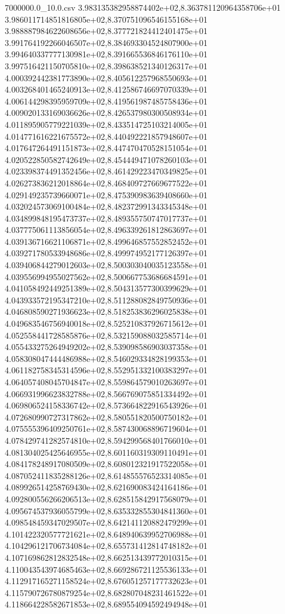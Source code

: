 \begin{filecontents*}{7000000.0_10.0.csv}
3.983135382958874402e+02,8.363781120964358706e+01
3.986011714851816805e+02,8.370751096546155168e+01
3.988887984622608656e+02,8.377721824412401475e+01
3.991764192266046507e+02,8.384693304524807900e+01
3.994640337777130981e+02,8.391665536846176110e+01
3.997516421150705810e+02,8.398638521340126317e+01
4.000392442381773890e+02,8.405612257968550693e+01
4.003268401465240913e+02,8.412586746697070339e+01
4.006144298395959709e+02,8.419561987485758436e+01
4.009020133169036626e+02,8.426537980300508934e+01
4.011895905779221039e+02,8.433514725103214005e+01
4.014771616221675572e+02,8.440492221857948607e+01
4.017647264491151873e+02,8.447470470528151054e+01
4.020522850582742649e+02,8.454449471078260103e+01
4.023398374491352456e+02,8.461429223470349825e+01
4.026273836212018864e+02,8.468409727669677522e+01
4.029149235739660071e+02,8.475390983639408660e+01
4.032024573069100484e+02,8.482372991343345348e+01
4.034899848195473737e+02,8.489355750747017737e+01
4.037775061113856054e+02,8.496339261812863697e+01
4.039136716621106871e+02,8.499646857552852452e+01
4.039271780533948686e+02,8.499974952177126397e+01
4.039406844279012603e+02,8.500303040035123558e+01
4.039556994955027562e+02,8.500667753686684591e+01
4.041058492449251389e+02,8.504313577300399629e+01
4.043933572195347210e+02,8.511288082849750936e+01
4.046808590271936623e+02,8.518253836296025838e+01
4.049683546756940018e+02,8.525210837926715612e+01
4.052558441728585876e+02,8.532159088032585714e+01
4.055433275264949202e+02,8.539098586903037358e+01
4.058308047444486988e+02,8.546029334828199353e+01
4.061182758345314596e+02,8.552951332100383297e+01
4.064057408045704847e+02,8.559864579010263697e+01
4.066931996623832788e+02,8.566769075851334492e+01
4.069806524158336742e+02,8.573664822916543926e+01
4.072680990727317862e+02,8.580551820500750182e+01
4.075555396409250761e+02,8.587430068896719604e+01
4.078429741282574810e+02,8.594299568401766010e+01
4.081304025425646955e+02,8.601160319309110491e+01
4.084178248917080509e+02,8.608012321917522058e+01
4.087052411835288126e+02,8.614855576523314085e+01
4.089926514258769430e+02,8.621690083424164186e+01
4.092800556266206513e+02,8.628515842917568079e+01
4.095674537936055799e+02,8.635332855304841360e+01
4.098548459347029507e+02,8.642141120882479299e+01
4.101422320577721621e+02,8.648940639952706988e+01
4.104296121706734084e+02,8.655731412814748182e+01
4.107169862812832548e+02,8.662513439772010315e+01
4.110043543974685463e+02,8.669286721125536133e+01
4.112917165271158524e+02,8.676051257177732623e+01
4.115790726780879254e+02,8.682807048231461522e+01
4.118664228582671853e+02,8.689554094592494948e+01

\end{filecontents*}
